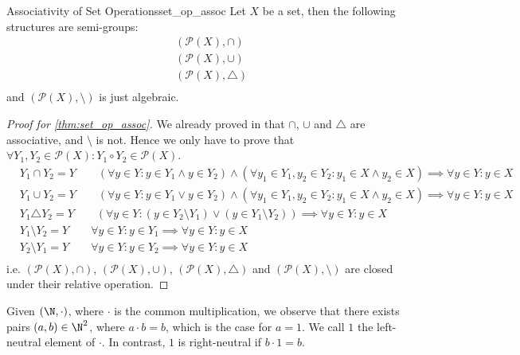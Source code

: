 \begin{theorem}{Associativity of Set Operations}{set_op_assoc}
    Let $X$ be a set, then the following structures are semi-groups:
    \begin{equation}
        \begin{aligned}
            &(\mathcal{P}(X),\cap)\\
            &(\mathcal{P}(X),\cup)\\
            &(\mathcal{P}(X),\triangle)\\
        \end{aligned}\label{eq:assoc_set_ops}
    \end{equation}
    and $(\mathcal{P}(X),\setminus)$ is just algebraic.
\end{theorem}
\begin{proof}[Proof for \autoref{thm:set_op_assoc}]\label{proof:assoc_set_ops}
    We already proved in  that $\cap$, $\cup$ and $\triangle$ are associative,
    and $\setminus$ is not. Hence we only have to prove that 
    $\forall Y_1,Y_2\in\mathcal{P}(X)\colon Y_1\circ Y_2\in\mathcal{P}(X)$.
    \begin{align*}
        &Y_1\cap Y_2 = Y\qquad (\forall y\in Y\colon y\in Y_1\wedge y\in Y_2) \wedge (\forall y_1\in Y_1,y_2\in Y_2
        \colon y_1\in X\wedge y_2\in X)\implies \forall y\in Y\colon y\in X\\
        &Y_1\cup Y_2 = Y\qquad (\forall y\in Y\colon y\in Y_1\vee y\in Y_2)\wedge (\forall y_1\in Y_1,y_2\in Y_2
        \colon y_1\in X\wedge y_2\in X)\implies \forall y\in Y\colon y\in X\\
        &Y_1\triangle Y_2 = Y\qquad (\forall y\in Y\colon (y\in Y_2\setminus Y_1)\vee (y\in Y_1\setminus Y_2))
        \implies \forall y\in Y\colon y\in X\\
        &Y_1\setminus Y_2 = Y\qquad \forall y\in Y\colon y\in Y_1 \implies \forall y\in Y\colon y\in X\\
        &Y_2\setminus Y_1 = Y\qquad \forall y\in Y\colon y\in Y_2 \implies \forall y\in Y\colon y\in X\\
    \end{align*}
    i.e. $(\mathcal{P}(X),\cap)$, $(\mathcal{P}(X),\cup)$, $(\mathcal{P}(X),\triangle)$ and $(\mathcal{P}(X),\setminus)$
    are closed under their relative operation.
\end{proof}

Given $(\N,\cdot)$, where $\cdot$ is the common multiplication, we observe that there exists pairs $(a,b)\in\N^2$,
where $a\cdot b = b$, which is the case for $a=1$. We call $1$ the left-neutral element of $\cdot$. In contrast, 
$1$ is right-neutral if $b\cdot 1 = b$.


